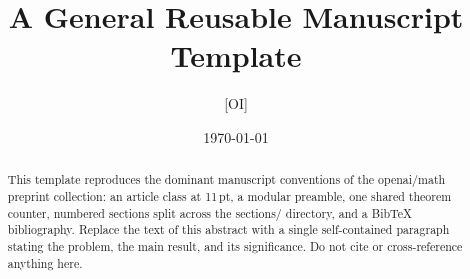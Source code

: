 \documentclass[11pt]{article}
\title{A General Reusable Manuscript Template}
\author{[OI]}
\date{\today}
\begin{document}
\maketitle

\begin{abstract}
This template reproduces the dominant manuscript conventions of the
openai/math preprint collection: an article class at 11\,pt, a modular
preamble, one shared theorem counter, numbered sections split across
the sections/ directory, and a BibTeX bibliography. Replace the text of
this abstract with a single self-contained paragraph stating the
problem, the main result, and its significance. Do not cite or
cross-reference anything here.
\end{abstract}

\tableofcontents
\clearpage






\appendix




\end{document}
